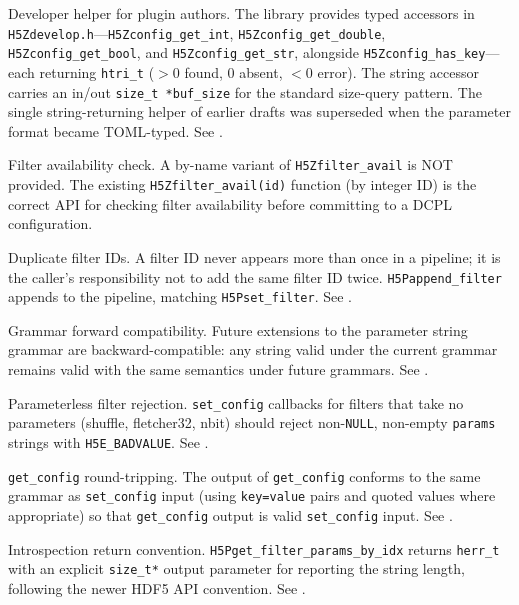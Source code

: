 \documentclass[../RFC-HDFG-2026-001.tex]{subfiles}
\begin{document}
Developer helper for plugin authors. The library provides typed accessors in
\texttt{H5Zdevelop.h}---\texttt{H5Zconfig\_get\_int},
\texttt{H5Zconfig\_get\_double}, \texttt{H5Zconfig\_get\_bool}, and
\texttt{H5Zconfig\_get\_str}, alongside \texttt{H5Zconfig\_has\_key}---each
returning \texttt{htri\_t} ($>0$ found, $0$ absent, $<0$ error).  The
string accessor carries an in/out \texttt{size\_t *buf\_size} for the standard
size-query pattern.  The single string-returning helper of earlier drafts was
superseded when the parameter format became TOML-typed.
See .

Filter availability check. A by-name variant of \texttt{H5Zfilter\_avail} is NOT
provided. The existing \texttt{H5Zfilter\_avail(id)} function (by integer ID) is the
correct API for checking filter availability before committing to a DCPL
configuration.

Duplicate filter IDs. A filter ID never appears more than once in a
pipeline; it is the caller's responsibility not to add the same filter ID
twice. \texttt{H5Pappend\_filter} appends to the pipeline, matching
\texttt{H5Pset\_filter}. See .

Grammar forward compatibility. Future extensions to the parameter
string grammar are backward-compatible: any string valid under the current
grammar remains valid with the same semantics under future grammars. See
.

Parameterless filter rejection. \texttt{set\_config} callbacks for filters
that take no parameters (shuffle, fletcher32, nbit) should reject
non-\texttt{NULL}, non-empty \texttt{params} strings with \texttt{H5E\_BADVALUE}. See
.

\texttt{get\_config} round-tripping. The output of \texttt{get\_config} conforms
to the same grammar as \texttt{set\_config} input (using \texttt{key=value}
pairs and quoted values where appropriate) so that \texttt{get\_config} output
is valid \texttt{set\_config} input. See .

Introspection return convention. \texttt{H5Pget\_filter\_params\_by\_idx} returns
\texttt{herr\_t} with an explicit \texttt{size\_t*} output parameter for reporting the
string length, following the newer HDF5 API convention. See
.
\end{document}
